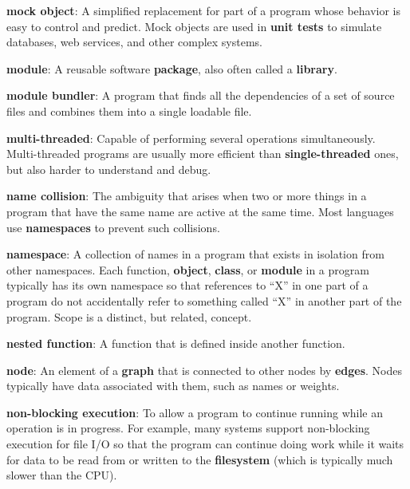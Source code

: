 \documentclass[krantzl]{krantz}
\newcommand{\glosskey}[1]{\textbf{#1}}
\begin{document}
\noindent \textbf{{\newline}\glosskey{mock object}}: 
A simplified replacement for part of a program whose behavior is easy to control and predict. Mock objects are used in \glosskey{unit tests} to simulate databases, web services, and other complex systems.


\noindent \textbf{{\newline}\glosskey{module}}: 
A reusable software \glosskey{package}, also often called a \glosskey{library}.


\noindent \textbf{{\newline}\glosskey{module bundler}}: 
A program that finds all the dependencies of a set of source files and combines them into a single loadable file.


\noindent \textbf{{\newline}\glosskey{multi-threaded}}: 
Capable of performing several operations simultaneously. Multi-threaded programs are usually more efficient than \glosskey{single-threaded} ones, but also harder to understand and debug.


\noindent \textbf{{\newline}\glosskey{name collision}}: 
The ambiguity that arises when two or more things in a program that have the same name are active at the same time. Most languages use \glosskey{namespaces} to prevent such collisions.


\noindent \textbf{{\newline}\glosskey{namespace}}: 
A collection of names in a program that exists in isolation from other namespaces. Each function, \glosskey{object}, \glosskey{class}, or \glosskey{module} in a program typically has its own namespace so that references to “X” in one part of a program do not accidentally refer to something called “X” in another part of the program. Scope is a distinct, but related, concept.


\noindent \textbf{{\newline}\glosskey{nested function}}: 
A function that is defined inside another function.


\noindent \textbf{{\newline}\glosskey{node}}: 
An element of a \glosskey{graph} that is connected to other nodes by \glosskey{edges}. Nodes typically have data associated with them, such as names or weights.


\noindent \textbf{{\newline}\glosskey{non-blocking execution}}: 
To allow a program to continue running while an operation is in progress. For example, many systems support non-blocking execution for file I/O so that the program can continue doing work while it waits for data to be read from or written to the \glosskey{filesystem} (which is typically much slower than the CPU).
\end{document}
